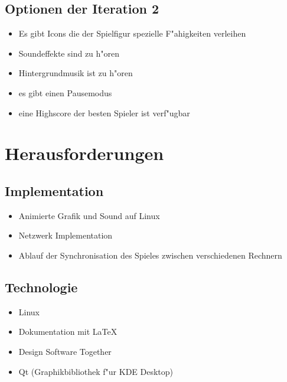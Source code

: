 \subsection{Optionen der Iteration 2}
\begin{itemize}
\item Es gibt Icons die der Spielfigur spezielle F"ahigkeiten verleihen
\item Soundeffekte sind zu h"oren
\item Hintergrundmusik ist zu h"oren
\item es gibt einen Pausemodus
\item eine Highscore der besten Spieler ist verf"ugbar
\end{itemize}

\section{Herausforderungen}

\subsection{Implementation}
\begin{itemize}{}{}
\item Animierte Grafik und Sound auf Linux
\item Netzwerk Implementation
\item Ablauf der Synchronisation des Spieles zwischen verschiedenen Rechnern
\end{itemize}

\subsection{Technologie}
\begin{itemize}{}{}
\item Linux
\item Dokumentation mit \LaTeX\
\item Design Software Together
\item Qt (Graphikbibliothek f"ur KDE Desktop)
\end{itemize}


